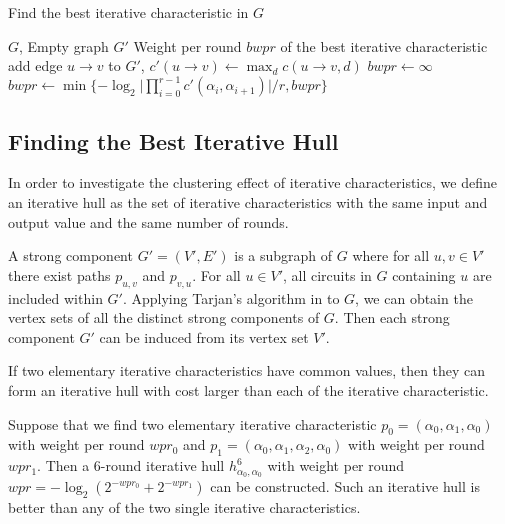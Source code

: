 \begin{algorithm}
	\caption{Find the best iterative characteristic in $G$}
	\label{algo:find_ite_c_G}
	\begin{algorithmic}[1]
        \Require $G$, Empty graph $G'$
        \Ensure Weight per round $bwpr$ of the best iterative characteristic
        \Procedure {}{}
        \State add edge $u\rightarrow v$ to $G'$, $c'(u\rightarrow v)\leftarrow \max_d c(u\rightarrow v,d)$
        \EndFor
        \State $bwpr\leftarrow\infty$
        \State $bwpr\leftarrow\min\{-\log_2\Big|\prod\limits_{i=0}^{r-1}c'(\alpha_i,\alpha_{i+1})\Big|/r,bwpr\}$        
        \EndFor
		\EndProcedure
	\end{algorithmic}
\end{algorithm}

\subsection{Finding the Best Iterative Hull}\label{sec:find_ite_h}

In order to investigate the clustering effect of iterative characteristics, we define an iterative hull as the set of iterative characteristics with the same input and output value and the same number of rounds. 

A strong component $G'=(V',E')$ is a subgraph of $G$ where for all $u,v\in V'$ there exist paths $p_{u,v}$ and $p_{v,u}$. For all $u\in V'$, all circuits in $G$ containing $u$ are included within $G'$. Applying Tarjan's algorithm in \cite{tarjan1972depth} to $G$, we can obtain the vertex sets of all the distinct strong components of $G$. Then each strong component $G'$ can be induced from its vertex set $V'$. 

If two elementary iterative characteristics have common values, then they can form an iterative hull with cost larger than each of the iterative characteristic. 
\begin{example}\label{exp:ih}
    Suppose that we find two elementary iterative characteristic $p_0=(\alpha_0,\alpha_1,\alpha_0)$ with weight per round $wpr_0$ and $p_1=(\alpha_0,\alpha_1,\alpha_2,\alpha_0)$ with weight per round $wpr_1$. Then a 6-round iterative hull $h_{\alpha_0,\alpha_0}^6$ with weight per round $wpr=-\log_2(2^{-wpr_0}+2^{-wpr_1})$ can be constructed. Such an iterative hull is better than any of the two single iterative characteristics.
\end{example}

